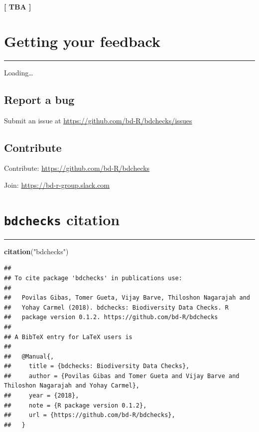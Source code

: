 \documentclass[]{book}
\newenvironment{Shaded}{\begin{snugshade}}{\end{snugshade}}
\newcommand{\KeywordTok}[1]{\textcolor[rgb]{0.13,0.29,0.53}{\textbf{#1}}}
\newcommand{\StringTok}[1]{\textcolor[rgb]{0.31,0.60,0.02}{#1}}
\newcommand{\NormalTok}[1]{#1}
\theoremstyle{definition}
\theoremstyle{definition}
\theoremstyle{definition}
\theoremstyle{remark}
\begin{document}
\textbf{{{[} TBA {]}}}

\chapter{Getting your feedback}\label{getting-your-feedback}

\begin{center}\rule{0.5\linewidth}{\linethickness}\end{center}

Loading\ldots{}

\section{Report a bug}\label{report-a-bug}

Submit an issue at \url{https://github.com/bd-R/bdchecks/issues}

\section{Contribute}\label{contribute}

Contribute: \url{https://github.com/bd-R/bdchecks}

Join: \url{https://bd-r-group.slack.com}

\chapter{\texorpdfstring{\texttt{bdchecks}
citation}{bdchecks citation}}\label{bdchecks-citation}

\begin{center}\rule{0.5\linewidth}{\linethickness}\end{center}

\begin{Shaded}
\begin{Highlighting}[]
\KeywordTok{citation}\NormalTok{(}\StringTok{"bdchecks"}\NormalTok{)}
\end{Highlighting}
\end{Shaded}

\begin{verbatim}
## 
## To cite package 'bdchecks' in publications use:
## 
##   Povilas Gibas, Tomer Gueta, Vijay Barve, Thiloshon Nagarajah and
##   Yohay Carmel (2018). bdchecks: Biodiversity Data Checks. R
##   package version 0.1.2. https://github.com/bd-R/bdchecks
## 
## A BibTeX entry for LaTeX users is
## 
##   @Manual{,
##     title = {bdchecks: Biodiversity Data Checks},
##     author = {Povilas Gibas and Tomer Gueta and Vijay Barve and Thiloshon Nagarajah and Yohay Carmel},
##     year = {2018},
##     note = {R package version 0.1.2},
##     url = {https://github.com/bd-R/bdchecks},
##   }
\end{verbatim}
\end{document}
